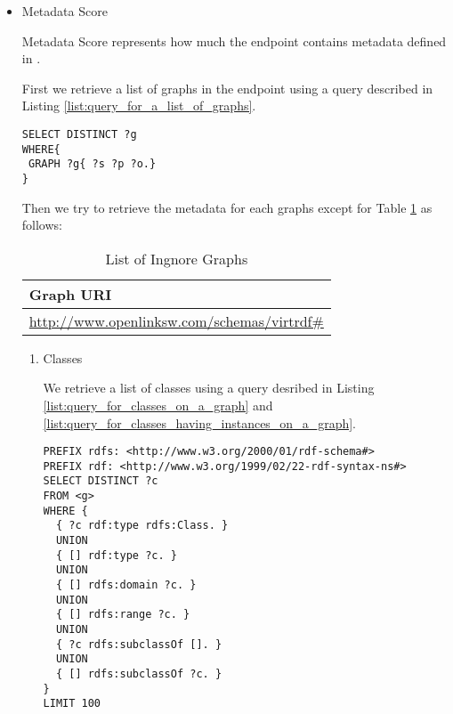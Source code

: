 \documentclass[11pt,a4paper]{article}
\begin{document}
\begin{itemize}
  \item Metadata Score

  Metadata Score represents how much the endpoint contains metadata defined in \cite{SparqleBuilderMetadata}.

  First we retrieve a list of graphs in the endpoint using a query described in Listing \ref{list:query_for_a_list_of_graphs}.

  \begin{lstlisting}[basicstyle=\ttfamily\footnotesize,breaklines=true,frame=single,caption=Obtain graph URIs on a SPARQL endpoint,label=list:query_for_a_list_of_graphs]
SELECT DISTINCT ?g
WHERE{
 GRAPH ?g{ ?s ?p ?o.}
}
  \end{lstlisting}

  Then we try to retrieve the metadata for each graphs except for Table \ref{table:ignore_graphs} as follows:

  \begin{table}[htbp]
    \center
    \begin{tabular}{|l|}
      \hline
      Graph URI \\
      \hline
      \url{http://www.openlinksw.com/schemas/virtrdf#} \\
      \hline
    \end{tabular}
    \caption{List of Ingnore Graphs}
    \label{table:ignore_graphs}
  \end{table}

  \begin{enumerate}

    \item Classes

    We retrieve a list of classes using a query desribed in Listing \ref{list:query_for_classes_on_a_graph} and \ref{list:query_for_classes_having_instances_on_a_graph}.

    \begin{lstlisting}[basicstyle=\ttfamily\footnotesize,breaklines=true,frame=single,caption=Obtain the classes on a graph g,label=list:query_for_classes_on_a_graph]
PREFIX rdfs: <http://www.w3.org/2000/01/rdf-schema#>
PREFIX rdf: <http://www.w3.org/1999/02/22-rdf-syntax-ns#>
SELECT DISTINCT ?c
FROM <g>
WHERE {
  { ?c rdf:type rdfs:Class. }
  UNION
  { [] rdf:type ?c. }
  UNION
  { [] rdfs:domain ?c. }
  UNION
  { [] rdfs:range ?c. }
  UNION
  { ?c rdfs:subclassOf []. }
  UNION
  { [] rdfs:subclassOf ?c. }
}
LIMIT 100
    \end{lstlisting}


\end{enumerate}
\end{itemize}
\end{document}
